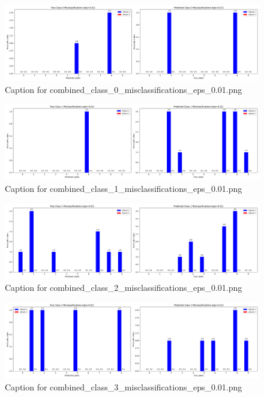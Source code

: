 \documentclass[11pt,onside]{article}
\begin{document}
\begin{figure}[ht]
\centering
\includegraphics[width=1\textwidth]{combined_class_boundary_pgd/combined_class_0_misclassifications_eps_0.01.png}
\caption{Caption for combined_class_0_misclassifications_eps_0.01.png}
\label{fig:combined_class_0_misclassifications_eps_0.01.png}
\end{figure}

\begin{figure}[ht]
\centering
\includegraphics[width=1\textwidth]{combined_class_boundary_pgd/combined_class_1_misclassifications_eps_0.01.png}
\caption{Caption for combined_class_1_misclassifications_eps_0.01.png}
\label{fig:combined_class_1_misclassifications_eps_0.01.png}
\end{figure}

\begin{figure}[ht]
\centering
\includegraphics[width=1\textwidth]{combined_class_boundary_pgd/combined_class_2_misclassifications_eps_0.01.png}
\caption{Caption for combined_class_2_misclassifications_eps_0.01.png}
\label{fig:combined_class_2_misclassifications_eps_0.01.png}
\end{figure}

\begin{figure}[ht]
\centering
\includegraphics[width=1\textwidth]{combined_class_boundary_pgd/combined_class_3_misclassifications_eps_0.01.png}
\caption{Caption for combined_class_3_misclassifications_eps_0.01.png}
\label{fig:combined_class_3_misclassifications_eps_0.01.png}
\end{figure}
\end{document}
